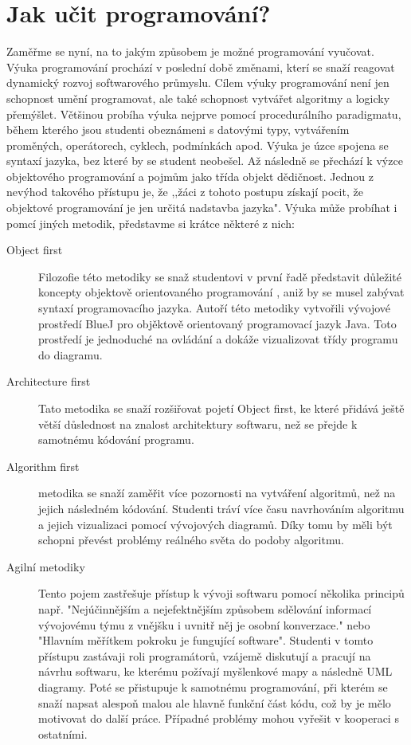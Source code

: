 \documentclass[FP,DP]{tulthesis}
\begin{document}
{{{{{{{\section{Jak učit programování?}
Zaměřme se nyní, na to jakým způsobem je možné programování vyučovat. Výuka programování  prochází v poslední době změnami, kterí se snaží reagovat dynamický rozvoj softwarového průmyslu. Cílem výuky programování není jen schopnost umění programovat, ale také schopnost vytvářet algoritmy a logicky přemýšlet. 
Většinou probíha výuka nejprve pomocí procedurálního paradigmatu, během kterého jsou studenti obeznámeni s datovými typy, vytvářením proměných, operátorech, cyklech, podmínkách apod. Výuka je úzce spojena se syntaxí jazyka, bez které by se student neobešel.  Až následně se přechází k výzce objektového programování a pojmům jako třída objekt dědičnost. Jednou z nevýhod takového přístupu je, že ,,žáci z tohoto postupu získají pocit, že objektové programování je jen určitá nadstavba jazyka".  
Výuka může probíhat i pomcí jiných metodik, představme si krátce některé z nich:
\begin{description}
\item [Object first] Filozofie této metodiky se snaž studentovi v první řadě představit důležité koncepty objektově orientovaného programování , aniž by se musel zabývat syntaxí programovacího jazyka. Autoří této metodiky vytvořili vývojové prostředí BlueJ pro objěktově  orientovaný programovací jazyk Java. Toto prostředí je jednoduché na ovládání a dokáže vizualizovat třídy programu do diagramu.
\item [Architecture first] Tato metodika se snaží rozšiřovat pojetí Object first, ke které přidává ještě větší důslednost na znalost architektury softwaru, než se přejde k samotnému kódování programu.
\item [Algorithm first]metodika se snaží zaměřit více pozornosti na vytváření algoritmů, než na jejich následném kódování. Studenti tráví více času navrhováním algoritmu a jejich vizualizaci pomocí vývojových diagramů. Díky tomu by měli být schopni převést problémy reálného světa do podoby algoritmu.
\item [Agilní metodiky] Tento pojem zastřešuje přístup k vývoji softwaru pomocí několika principů např. "Nejúčinnějším a nejefektnějším způsobem sdělování informací vývojovému týmu z vnějšku i uvnitř něj je osobní konverzace." nebo "Hlavním měřítkem pokroku je fungující software". Studenti v tomto přístupu zastávaji roli programátorů, vzájemě diskutují a pracují na návrhu softwaru, ke kterému požívají myšlenkové mapy a následně UML diagramy. Poté se přistupuje k samotnému programování, při kterém se snaží napsat alespoň malou ale hlavně funkční část kódu, což by je mělo motivovat do další práce. Případné problémy mohou vyřešit v kooperaci s ostatními.

\end{description}}}}}}}}
\end{document}
